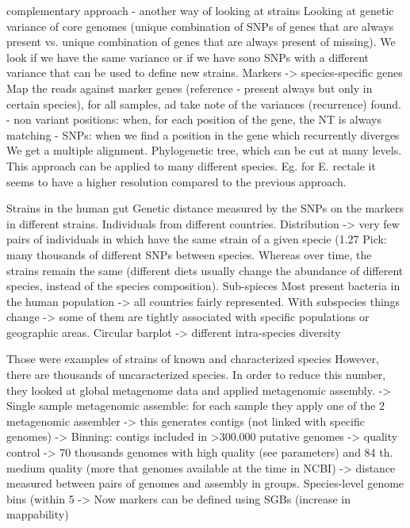 complementary approach - another way of looking at strains
Looking at genetic variance of core genomes (unique combination of SNPs of genes that are always present vs. unique combination of genes that are always present of missing).
We look if we have the same variance or if we have sono SNPs with a different variance that can be used to define new strains. 
Markers -> species-specific genes
Map the reads against marker genes (reference - present always but only in certain species), for all samples, ad take note of the variances (recurrence) found.
- non variant positions: when, for each position of the gene, the NT is always matching
- SNPs: when we find a position in the gene which recurrently diverges
 We get a multiple alignment. Phylogenetic tree, which can be cut at many levels. 
This approach can be applied to many different species. Eg. for E. rectale it seems to have a higher resolution compared to the previous approach.

Strains in the human gut
Genetic distance measured by the SNPs on the markers in different strains. Individuals from different countries. 
Distribution -> very few pairs of individuals in which have the same strain of a given specie (1.27%
Pick: many thousands of different SNPs between species. 
Whereas over time, the strains remain the same (different diets usually change the abundance of different species, instead of the species composition).
Sub-spieces 
Most present bacteria in the human population -> all countries fairly represented.
With subspecies things change -> some of them are tightly associated with specific populations or geographic areas.
Circular barplot -> different intra-species diversity 

Those were examples of strains of known and characterized species
However, there are thousands of uncaracterized species. In order to reduce this number, they looked at global metagenome data and applied metagenomic assembly. 
-> Single sample metagenomic assemble: for each sample they apply one of the 2 metagenomic assembler -> this generates contigs (not linked with specific genomes)
-> Binning: contigs included in >300.000 putative genomes
-> quality control -> 70 thousands genomes with high quality (see parameters) and 84 th. medium quality (more that genomes available at the time in NCBI)
-> distance measured between pairs of genomes and assembly in groups. Species-level genome bins (within 5%
-> Now markers can be defined using SGBs (increase in mappability)

